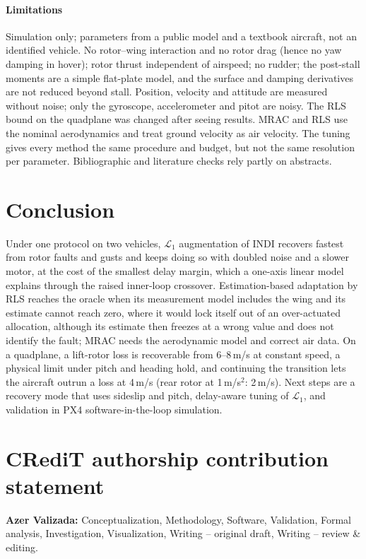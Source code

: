 \documentclass[preprint,12pt,a4paper]{elsarticle}
\begin{document}
\paragraph{Limitations} Simulation only; parameters from a public model and a textbook aircraft, not an identified vehicle. No rotor--wing
interaction and no rotor drag (hence no yaw damping in hover); rotor thrust independent of airspeed; no rudder; the post-stall moments are a
simple flat-plate model, and the surface and damping derivatives are not reduced beyond stall. Position, velocity and attitude are measured
without noise; only the gyroscope, accelerometer and pitot are noisy. The RLS bound on the quadplane was changed after seeing results. MRAC
and RLS use the nominal aerodynamics and treat ground velocity as air velocity. The tuning gives every method the same procedure and
budget, but not the same resolution per parameter. Bibliographic and literature checks rely partly on abstracts.

\section{Conclusion}
Under one protocol on two vehicles, $\mathcal{L}_1$ augmentation of INDI recovers fastest from rotor faults and gusts and keeps doing so
with doubled noise and a slower motor, at the cost of the smallest delay margin, which a one-axis linear model explains through the raised
inner-loop crossover. Estimation-based adaptation by RLS reaches the oracle when its measurement model includes the wing and its estimate
cannot reach zero, where it would lock itself out of an over-actuated allocation, although its estimate then freezes at a wrong value and
does not identify the fault; MRAC needs the aerodynamic model and correct air data. On a
quadplane, a lift-rotor loss is recoverable from 6--8\,m/s at constant speed, a physical limit under pitch and heading hold, and continuing the
transition lets the aircraft outrun a loss at 4\,m/s (rear rotor at 1\,m/s$^2$: 2\,m/s). Next steps are a recovery mode that uses sideslip and pitch, delay-aware
tuning of $\mathcal{L}_1$, and validation in PX4 software-in-the-loop simulation.

\section*{CRediT authorship contribution statement}
\textbf{Azer Valizada:} Conceptualization, Methodology, Software, Validation, Formal analysis, Investigation, Visualization,
Writing -- original draft, Writing -- review \& editing.
\end{document}
